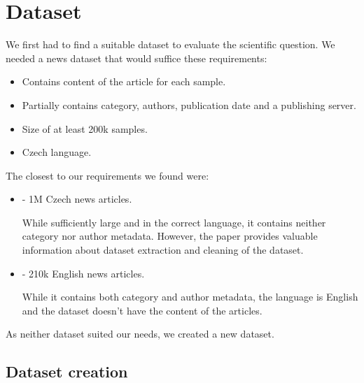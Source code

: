 \chapter{Dataset}
\label{chap:math}
We first had to find a suitable dataset to evaluate the scientific question.
We needed a news dataset that would suffice these requirements:
\begin{itemize}
    \item Contains content of the article for each sample.
    \item Partially contains category, authors, publication date and a publishing server.
    \item Size of at least 200k samples.
    \item Czech language.
\end{itemize}
The closest to our requirements we found were:
\begin{itemize}
    \item \parencite{strakaSumeCzechLargeCzech2018a} - 1M Czech news articles.

          While sufficiently large and in the correct language,
          it contains neither category nor author metadata.
          However, the paper provides valuable information about dataset extraction
          and cleaning of the dataset.
    \item \parencite{misraNewsCategoryDataset2022} - 210k English news articles.

          While it contains both category and author metadata,
          the language is English and the dataset doesn't
          have the content of the articles.
\end{itemize}
As neither dataset suited our needs, we created a new dataset.

\section{Dataset creation}
\label{sec:dataset-creation}

